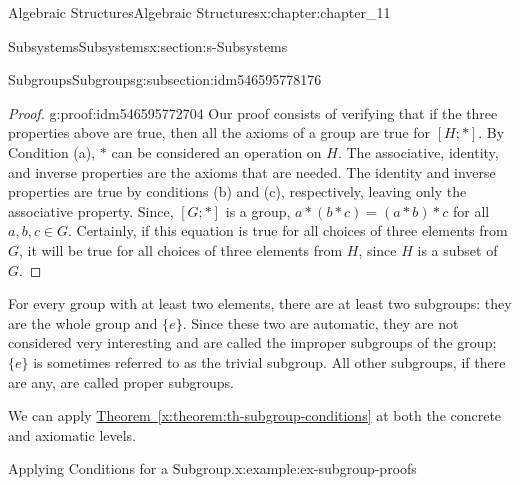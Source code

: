 \documentclass[oneside,10pt,]{book}
\newcommand{\xreffont}{\relax}
\numberwithin{equation}{section}
\begin{document}
\begin{chapterptx}{Algebraic Structures}{}{Algebraic Structures}{}{}{x:chapter:chapter_11}
\begin{sectionptx}{Subsystems}{}{Subsystems}{}{}{x:section:s-Subsystems}
\begin{subsectionptx}{Subgroups}{}{Subgroups}{}{}{g:subsection:idm546595778176}
\begin{proof}{}{g:proof:idm546595772704}
Our proof consists of verifying that if the three properties above are true, then all the axioms of a group are true for \([H ; *]\). By Condition (a), \(*\) can be considered an operation on \(H\). The associative, identity, and inverse properties are the axioms that are needed. The identity and inverse properties are true by conditions (b) and (c), respectively, leaving only the associative property. Since, \([G; *]\) is a group, \(a * (b * c) = (a * b) * c\) for all \(a, b, c \in  G\). Certainly, if this equation is true for all choices of three elements from \(G\), it will be true for all choices of three elements from \(H\), since \(H\) is a subset of \(G\).%
\end{proof}
For every group with at least two elements, there are at least two subgroups: they are the whole group and \(\{e\}\). Since these two are automatic, they are not considered very interesting and are called the improper subgroups of the group; \(\{e\}\) is sometimes referred to as the trivial subgroup. All other subgroups, if there are any, are called proper subgroups.%
\par
We can apply \hyperref[x:theorem:th-subgroup-conditions]{Theorem~{\xreffont\ref{x:theorem:th-subgroup-conditions}}} at both the concrete and axiomatic levels.%
\begin{example}{Applying Conditions for a Subgroup.}{x:example:ex-subgroup-proofs}%
%
\begin{enumerate}[label=(\alph*)]

\end{enumerate}
\end{example}
\end{subsectionptx}
\end{sectionptx}
\end{chapterptx}
\end{document}
